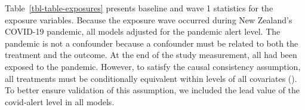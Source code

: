 \documentclass[
  singlecolumn]{article}
\begin{document}
Table~\ref{tbl-table-exposures} presents baseline and wave 1 statistics
for the exposure variables. Because the exposure wave occurred during
New Zealand's COVID-19 pandemic, all models adjusted for the pandemic
alert level. The pandemic is not a confounder because a confounder must
be related to both the treatment and the outcome. At the end of the
study measurement, all had been exposed to the pandemic. However, to
satisfy the causal consistency assumption, all treatments must be
conditionally equivalent within levels of all covariates
(). To better
ensure validation of this assumption, we included the lead value of the
covid-alert level in all models.
\end{document}
